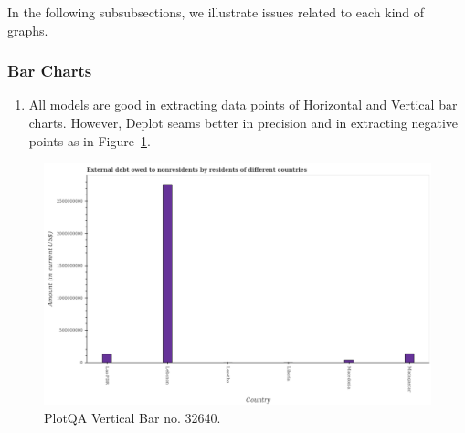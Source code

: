 \documentclass[
	letterpaper, %
]{jdf}
\begin{document}
       In the following subsubsections, we illustrate issues related to each kind of graphs.

\subsubsection{Bar Charts}\label{sssect:bar-errors}
\begin{enumerate}
    \item All models are good in extracting data points of Horizontal and Vertical bar charts.
        However, Deplot seams better in precision and in extracting negative points as in Figure~\ref{fig:plotqa-vbar-32640}.
       \end{enumerate}
       \begin{figure}
            \includegraphics{test-sample/plotqa/images/vertical-bar/32640.png}
            \caption{PlotQA Vertical Bar no. 32640.}
            \label{fig:plotqa-vbar-32640}
             \end{figure}
             
             
             
\end{document}
